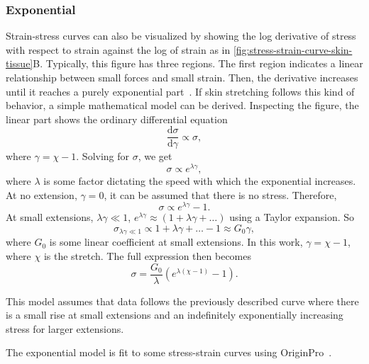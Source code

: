 \subsubsection{Exponential}\label{subsubsec:exp}
Strain-stress curves can also be visualized by showing the log derivative of stress with respect to strain against the log of strain as in \cref{fig:stress-strain-curve-skin-tissue}B.
Typically, this figure has three regions.
The first region indicates a linear relationship between small forces and small strain.
Then, the derivative increases until it reaches a purely exponential part~.
If skin stretching follows this kind of behavior, a simple mathematical model can be derived.
Inspecting the figure, the linear part shows the ordinary differential equation
\begin{equation}
    \frac{\mathrm{d}\sigma}{\mathrm{d}\gamma} \propto \sigma,
\end{equation}
where $\gamma = \chi - 1$.
Solving for $\sigma$, we get
\begin{equation}
    \sigma \propto e^{\lambda\gamma},
\end{equation}
where $\lambda$ is some factor dictating the speed with which the exponential increases.
At no extension, $\gamma=0$, it can be assumed that there is no stress.
Therefore,
\begin{equation}
    \sigma \propto e^{\lambda\gamma} - 1.
\end{equation}
At small extensions, $\lambda\gamma \ll 1$, $e^{\lambda\gamma} \approx (1 + \lambda\gamma + \ldots)$ using a Taylor expansion.
So
\begin{equation}
    \sigma_{\lambda\gamma\ll 1} \propto 1 + \lambda\gamma + \ldots - 1 \approx G_0 \gamma,
\end{equation}
where $G_0$ is some linear coefficient at small extensions.
In this work, $\gamma = \chi - 1$, where $\chi$ is the stretch.
The full expression then becomes
\begin{equation}\label{eq:exp}
    \sigma = \frac{G_0}{\lambda}\left(e^{\lambda(\chi - 1)}-1\right).
\end{equation}

This model assumes that data follows the previously described curve where there is a small rise at small extensions and an indefinitely exponentially increasing stress for larger extensions.

The exponential model is fit to some stress-strain curves using OriginPro~.

